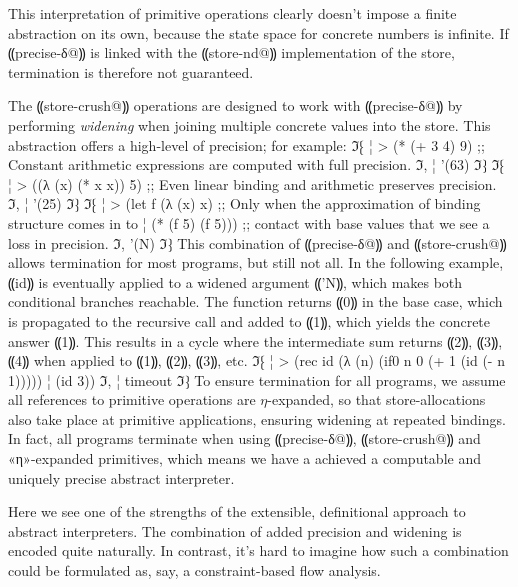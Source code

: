 This interpretation of primitive operations clearly doesn't impose a finite
abstraction on its own, because the state space for concrete numbers is
infinite. If ⸨precise-δ@⸩ is linked with the ⸨store-nd@⸩ implementation of the
store, termination is therefore not guaranteed.  

The ⸨store-crush@⸩ operations are designed to work with ⸨precise-δ@⸩ by
performing \emph{widening} when joining multiple concrete values into the
store. This abstraction offers a high-level of precision; for example:
ℑ⁅
¦ > (* (+ 3 4) 9)        ;; Constant arithmetic expressions are computed with full precision.
ℑ,
¦ '(63)
ℑ⁆
ℑ⁅
¦ > ((λ (x) (* x x)) 5)  ;; Even linear binding and arithmetic preserves precision.
ℑ,
¦ '(25)
ℑ⁆
ℑ⁅
¦ > (let f (λ (x) x)     ;; Only when the approximation of binding structure comes in to
¦     (* (f 5) (f 5)))   ;; contact with base values that we see a loss in precision.
ℑ,
'(N)
ℑ⁆
This combination of ⸨precise-δ@⸩ and ⸨store-crush@⸩ allows termination for most
programs, but still not all. In the following example, ⸨id⸩ is eventually
applied to a widened argument ⸨'N⸩, which makes both conditional branches
reachable. The function returns ⸨0⸩ in the base case, which is propagated to
the recursive call and added to ⸨1⸩, which yields the concrete answer ⸨1⸩.
This results in a cycle where the intermediate sum returns ⸨2⸩, ⸨3⸩, ⸨4⸩ when
applied to ⸨1⸩, ⸨2⸩, ⸨3⸩, etc.
ℑ⁅
¦ > (rec id (λ (n) (if0 n 0 (+ 1 (id (- n 1)))))
¦     (id 3))
ℑ,
¦ timeout
ℑ⁆
To ensure termination for all programs, we assume all references to
primitive operations are $η$-expanded, so that store-allocations also
take place at primitive applications, ensuring widening at repeated
bindings. In fact, all programs terminate when using ⸨precise-δ@⸩,
⸨store-crush@⸩ and «η»-expanded primitives, which means we have a
achieved a computable and uniquely precise abstract interpreter.

Here we see one of the strengths of the extensible, definitional approach to
abstract interpreters. The combination of added precision and widening is
encoded quite naturally. In contrast, it's hard to imagine how such a
combination could be formulated as, say, a constraint-based flow analysis.
